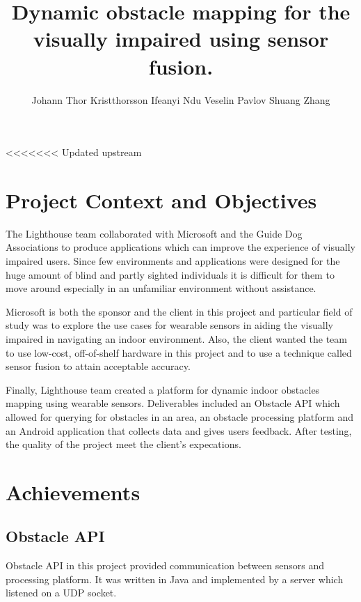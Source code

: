 \documentclass[prodmode,acmtosem]{acmsmall} %
\begin{document}

\title{Dynamic obstacle mapping for the visually impaired using sensor fusion.}
\author{Johann Thor Kristthorsson
Ifeanyi Ndu
Veselin Pavlov
Shuang Zhang
}
\maketitle
<<<<<<< Updated upstream

\section{Project Context and Objectives}
The Lighthouse team collaborated with Microsoft and the Guide Dog Associations to produce applications which can improve the experience of visually impaired users. Since few environments and applications were designed for the huge amount of blind and partly sighted individuals it is difficult for them to move around especially in an unfamiliar environment without assistance. 

Microsoft is both the sponsor and the client in this project and particular field of study was to explore the use cases for wearable sensors in aiding the visually impaired in navigating an indoor environment. Also, the client wanted the team to use low-cost, off-of-shelf hardware in this project and to use a technique called sensor fusion to attain acceptable accuracy.

Finally, Lighthouse team created a platform for dynamic indoor obstacles mapping using wearable sensors. Deliverables included an Obstacle API which allowed for querying for obstacles in an area, an obstacle processing platform and an Android application that collects data and gives users feedback. After testing, the quality of the project meet the client's expecations.

\section{Achievements}
\subsection{Obstacle API}
Obstacle API in this project provided communication between sensors and processing platform. It was written in Java and implemented by a server which listened on a UDP socket.
\end{document}
